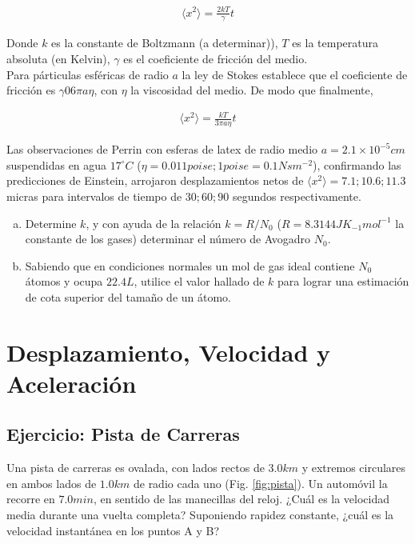\documentclass{replab}
\begin{document}
	\begin{align*}
		\langle x^2 \rangle = \frac{2kT}{\gamma}t
	\end{align*}

	Donde $k$ es la constante de Boltzmann (a determinar)), $T$ es la temperatura absoluta (en Kelvin), $\gamma$ es el coeficiente de fricción del medio.\\ 

	Para párticulas esféricas de radio $a$ la ley de Stokes establece que el coeficiente de fricción es $\gamma 0 6\pi a \eta$, con $\eta$ la viscosidad del medio. De modo que finalmente,
	
	\begin{align*}
		\langle x^2 \rangle = \frac{kT}{3\pi a \eta}t
	\end{align*}

	Las observaciones de Perrin con esferas de latex de radio medio $a = 2.1 \times 10^{-5}cm$ suspendidas en agua $17^{\circ}C$ ($\eta = 0.011 poise; 1 poise = 0.1 Nsm^{-2}$), confirmando las predicciones de Einstein, arrojaron desplazamientos netos de $\langle x^2 \rangle = 7.1; 10.6; 11.3$ micras para intervalos de tiempo de $30; 60; 90$ segundos respectivamente.\\

	\begin{enumerate}[a)]
		\item Determine $k$, y con ayuda de la relación $k=R/N_0$ ($R=8.3144 JK_{-1}mol^{-1}$ la constante de los gases) determinar el número de Avogadro $N_0$.
		\item Sabiendo que en condiciones normales un mol de gas ideal contiene $N_0$ átomos y ocupa $22.4L$, utilice el valor hallado de $k$ para lograr una estimación de cota superior del tamaño de un átomo.
	\end{enumerate}
	

	\section{Desplazamiento, Velocidad y Aceleración}

	\subsection{Ejercicio: Pista de Carreras}
	Una pista de carreras es ovalada, con lados rectos de $3.0km$ y extremos circulares en ambos lados de $1.0km$ de radio cada uno (Fig. \ref{fig:pista}). Un automóvil la recorre en $7.0min$, en sentido de las manecillas del reloj. ¿Cuál es la velocidad media durante una vuelta completa? Suponiendo rapidez constante, ¿cuál es la velocidad instantánea en los puntos A y B? 
\end{document}
